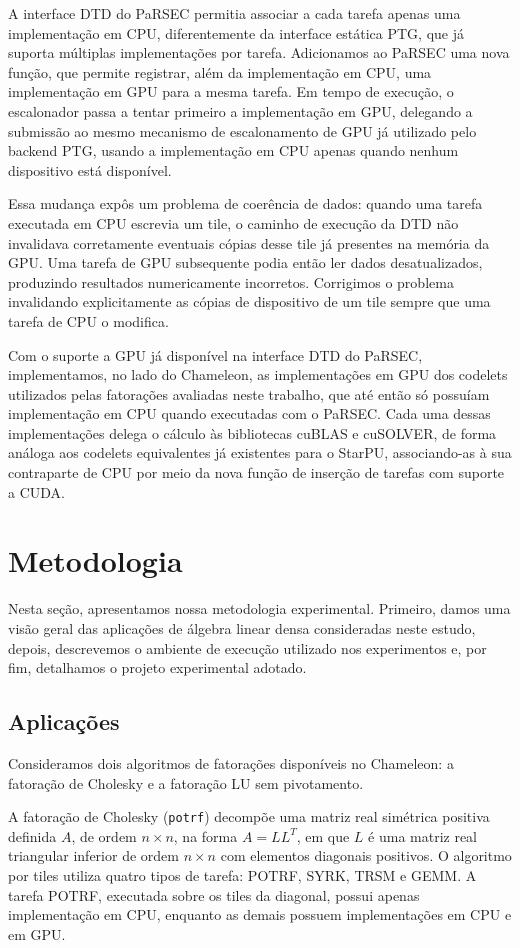 \documentclass[12pt]{article}
\begin{document}
A interface DTD do PaRSEC permitia associar a cada tarefa apenas uma implementação em CPU, diferentemente da interface estática PTG, que já suporta múltiplas implementações por tarefa. Adicionamos ao PaRSEC uma nova função, que permite registrar, além da implementação em CPU, uma implementação em GPU para a mesma tarefa. Em tempo de execução, o escalonador passa a tentar primeiro a implementação em GPU, delegando a submissão ao mesmo mecanismo de escalonamento de GPU já utilizado pelo backend PTG, usando a implementação em CPU apenas quando nenhum dispositivo está disponível.

Essa mudança expôs um problema de coerência de dados: quando uma tarefa executada em CPU escrevia um tile, o caminho de execução da DTD não invalidava corretamente eventuais cópias desse tile já presentes na memória da GPU. Uma tarefa de GPU subsequente podia então ler dados desatualizados, produzindo resultados numericamente incorretos. Corrigimos o problema invalidando explicitamente as cópias de dispositivo de um tile sempre que uma tarefa de CPU o modifica.

Com o suporte a GPU já disponível na interface DTD do PaRSEC, implementamos, no lado do Chameleon, as implementações em GPU dos codelets utilizados pelas fatorações avaliadas neste trabalho, que até então só possuíam implementação em CPU quando executadas com o PaRSEC. Cada uma dessas implementações delega o cálculo às bibliotecas cuBLAS e cuSOLVER, de forma análoga aos codelets equivalentes já existentes para o StarPU, associando-as à sua contraparte de CPU por meio da nova função de inserção de tarefas com suporte a CUDA.


\section{Metodologia}
Nesta seção, apresentamos nossa metodologia experimental. Primeiro, damos uma visão geral das aplicações de álgebra linear densa consideradas neste estudo, depois, descrevemos o ambiente de execução utilizado nos experimentos e, por fim, detalhamos o projeto experimental adotado.
\subsection{Aplicações}

Consideramos dois algoritmos de fatorações disponíveis no Chameleon: a fatoração de Cholesky e a fatoração LU sem pivotamento.

A fatoração de Cholesky (\texttt{potrf}) decompõe uma matriz real simétrica positiva definida $A$, de ordem $n \times n$, na forma $A = LL^T$, em que $L$ é uma matriz real triangular inferior de ordem $n \times n$ com elementos diagonais positivos. O algoritmo por tiles utiliza quatro tipos de tarefa: POTRF, SYRK, TRSM e GEMM. A tarefa POTRF, executada sobre os tiles da diagonal, possui apenas implementação em CPU, enquanto as demais possuem implementações em CPU e em GPU.
\end{document}

